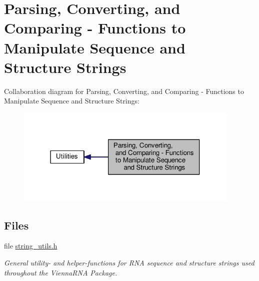 \hypertarget{group__string__utils}{\section{Parsing, Converting, and Comparing -\/ Functions to Manipulate Sequence and Structure Strings}
\label{group__string__utils}
}
Collaboration diagram for Parsing, Converting, and Comparing -\/ Functions to Manipulate Sequence and Structure Strings\-:
\nopagebreak
\begin{figure}[H]
\begin{center}
\leavevmode
\includegraphics[width=304pt]{group__string__utils}
\end{center}
\end{figure}
\subsection*{Files}
\begin{DoxyCompactItemize}
\item 
file \hyperlink{string__utils_8h}{string\-\_\-utils.\-h}
\begin{DoxyCompactList}\small\item\em General utility-\/ and helper-\/functions for R\-N\-A sequence and structure strings used throughout the Vienna\-R\-N\-A Package. \end{DoxyCompactList}\end{DoxyCompactItemize}
